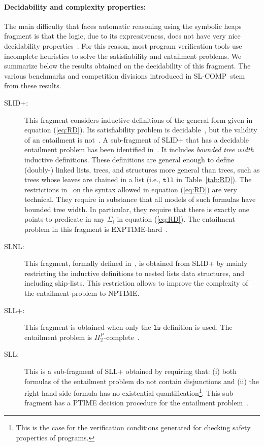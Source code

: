 \documentclass[twoside,11pt]{article}
\newcommand{\ls}{\mathtt{ls}}
\newcommand{\SLRD}{\textsc{SLID}}
\newcommand{\SLNL}{\textsc{SLNL}}
\newcommand{\SLL}{\textsc{SLL}}
\newcommand{\slcomp}{\textsf{SL-COMP}}
\begin{document}
\paragraph{Decidability and complexity properties:}
The main difficulty that faces automatic reasoning using the symbolic heaps fragment is that the logic, 
due to its expressiveness, does not have very nice decidability properties~\cite{AntonopoulosGHKO14}.
For this reason, most program verification tools use incomplete heuristics to solve the satisfiability and entailment problems.
%
We summarize below the results obtained on the decidability of this fragment.
The various benchmarks and competition divisions introduced in \slcomp\ stem from these results.
\begin{description}
\item[\SLRD+:]
This fragment considers inductive definitions of the general form given in equation (\ref{eq:RD}).
Its satisfiability problem is decidable~\cite{BrotherstonFGNP13},
but the validity of an entailment is not~\cite{AntonopoulosGHKO14}.
%
A sub-fragment of \SLRD+ that has a decidable entailment problem has been identified in~\cite{IosifRS13}. 
It includes \emph{bounded tree width} inductive definitions.
These definitions are general enough to define (doubly-) linked lists, trees,
and structures more general than trees, such as trees whose leaves are chained in
a list (i.e., $\mathtt{tll}$ in Table~\ref{tab:RD}). 
The restrictions in~\cite{IosifRS13} on the syntax allowed in equation (\ref{eq:RD}) are very technical. They require in substance that all models of such formulas have bounded tree width. 
In particular, they require that there is exactly one points-to predicate in any $\Sigma_i$ in equation (\ref{eq:RD}).
The entailment problem in this fragment is EXPTIME-hard~\cite{AntonopoulosGHKO14}.

\item[\SLNL:]
This fragment, formally defined in~\cite{EneaLSV14}, is obtained from \SLRD+ by mainly restricting the inductive definitions to nested lists data structures, and including skip-lists. 
This restriction allows to improve the complexity of the entailment problem to NPTIME. 

\item[\SLL+:]
This fragment is obtained when only the $\ls$ definition is used.
The entailment problem is $\Pi^P_2$-complete~\cite{AntonopoulosGHKO14}.

\item[\SLL:]
This is a sub-fragment of \SLL+ obtained by requiring that:
(i) both formulas of the entailment problem do not contain disjunctions and 
(ii) the right-hand side formula has no existential quantification\footnote{This is the case for the verification conditions generated for checking safety properties of programs.}. 
This sub-fragment has a PTIME decision procedure for the entailment problem~\cite{CookHOPW11}.
\end{description}
\end{document}
